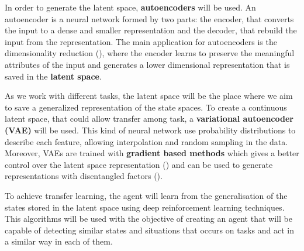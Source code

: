 

In order to generate the latent space, \textbf{autoencoders} will be used. An autoencoder is a neural network formed by two parts: the encoder, that converts the input to a dense and smaller representation and the decoder, that rebuild the input from the representation. The main application for autoencoders is the dimensionality reduction (\cite{Hinton504}), where the encoder learns to preserve the meaningful attributes of the input and generates a lower dimensional representation that is saved in the \textbf{latent space}. 

As we work with different tasks, the latent space will be the place where we aim to save a generalized representation of the state spaces. To create a continuous latent space, that could allow transfer among task, a \textbf{variational autoencoder (VAE)} will be used. This kind of neural network use probability distributions to describe each feature, allowing interpolation and random sampling in the data. Moreover, VAEs are trained with \textbf{gradient based methods} which gives a better control over the latent space representation (\cite{goodfellow2016deep}) and can be used to generate representations with disentangled factors (\cite{2016arXiv160605579H}).

To achieve transfer learning, the agent will learn from the generalisation of the states stored in the latent space using deep reinforcement learning techniques. This algorithms will be used with the objective of creating an agent that will be capable of detecting similar states and situations that occurs on tasks and act in a similar way in each of them. 




